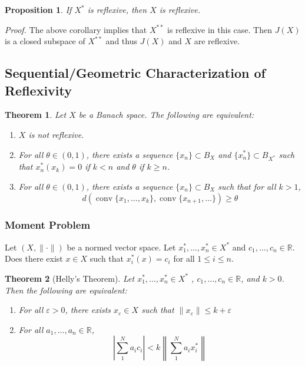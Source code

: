 \documentclass[11pt, reqno]{article}
\theoremstyle{plain}
\newtheorem*{theorem}{Theorem}
\newtheorem*{proposition}{Proposition}
\theoremstyle{definition}
\theoremstyle{remark}
\renewcommand{\epsilon}{\varepsilon}
\newcommand{\RR}{\mathbb{R}}
\begin{document}
\begin{proposition}
    If $X^*$ is reflexive, then $X$ is reflexive. 
\end{proposition}

\textit{Proof.} The above corollary implies that $X^{**}$ is reflexive in this case. Then $J(X)$ is a closed subspace
of $X^{**}$ and thus $J(X)$ and $X$ are reflexive.

\subsection*{Sequential/Geometric Characterization of Reflexivity}

\begin{theorem}
    Let $X$ be a Banach space. The following are equivalent:
    \begin{enumerate}
        \item $X$ is not reflexive.
        \item For all $\theta \in (0,1)$, there exists a sequence $\{x_n\} \subset B_X$ and $\{x_n^*\} \subset B_{X^*}$ 
        such that $x_n^*(x_k) = 0$ if $k < n$ and $\theta$ if $k \geq n$.
        \item For all $\theta \in (0,1)$, there exists a sequence $\{x_n\} \subset B_X$ such that for all $k > 1$,
        \[d(\operatorname{conv}\{x_1, \dots, x_k\}, \operatorname{conv}\{x_{n+1}, \dots\}) \geq \theta\]
    \end{enumerate}
\end{theorem}

\subsubsection*{Moment Problem}

Let $(X, \|\cdot\|)$ be a normed vector space. Let $x_1^*, \dots, x_n^* \in X^*$ and $c_1, \dots, c_n \in \RR$. 
Does there exist $x \in X$ such that $x_i^*(x) = c_i$ for all $1 \leq i \leq n$. 

\begin{theorem}[Helly's Theorem]
    Let $x_1^*,\dots, x_n^* \in X^*$ , $c_1,\dots, c_n \in \RR$, and $k > 0$. Then the following are equivalent:
    \begin{enumerate}
        \item For all $\epsilon > 0$, there exists $x_\epsilon \in X$ such that $\|x_\epsilon\| \leq k + \epsilon$
        \item For all $a_1,\dots, a_n \in \RR$, 
        \[
            \left|\sum_1^N a_i c_i\right| < k\left\| \sum_1^N a_i x_i^*\right\|
        \]
    \end{enumerate}
\end{theorem}
\end{document}
